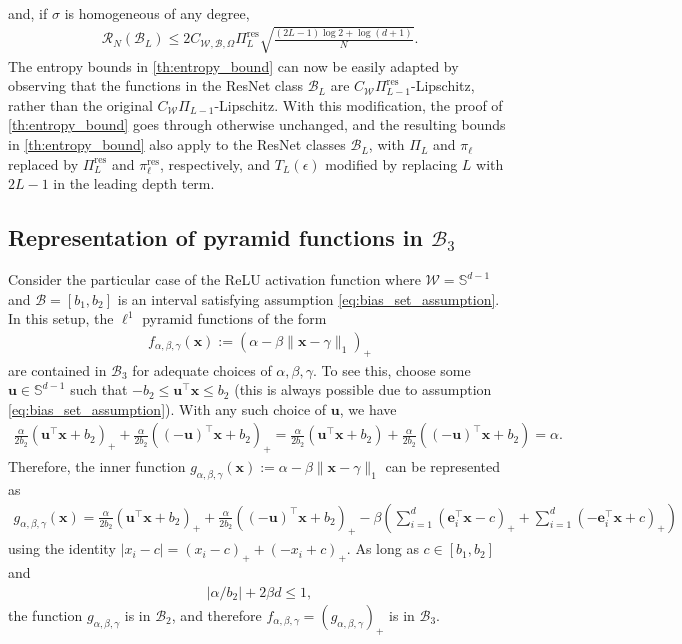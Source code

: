 \documentclass{article}
\def\ve{{\bm{e}}}
\def\vu{{\bm{u}}}
\def\vx{{\bm{x}}}
\def\cB{{\mathcal{B}}}
\def\cR{{\mathcal{R}}}
\def\cW{{\mathcal{W}}}
\def\bS{{\mathbb{S}}}
\begin{document}
\begin{appendices}
\begin{align}
    \end{align}
    and, if $\sigma$ is homogeneous of any degree,
    \begin{align}
        \cR_N(\cB_L) \leq 2 C_{\cW, \cB, \Omega} \Pi_L^{\mathrm{res}} \sqrt{\frac{(2L-1) \log 2 + \log(d+1)}{N}}.
    \end{align}
    The entropy bounds in \cref{th:entropy_bound} can now be easily adapted by observing that the functions in the ResNet class $\cB_L$ are $C_{\cW} \Pi_{L-1}^{\mathrm{res}}$-Lipschitz, rather than the original $C_{\cW} \Pi_{L-1}$-Lipschitz. With this modification, the proof of \cref{th:entropy_bound} goes through otherwise unchanged, and the resulting bounds in \cref{th:entropy_bound} also apply to the ResNet classes $\cB_L$, with $\Pi_L$ and $\pi_\ell$ replaced by $\Pi_L^{\mathrm{res}}$ and $\pi_\ell^{\mathrm{res}}$, respectively, and $T_L(\epsilon)$ modified by replacing $L$ with $2L-1$ in the leading depth term.
    


\subsection{Representation of pyramid functions in $\cB_3$} \label{appendix:pyramid_relu_rep}

Consider the particular case of the ReLU activation function where $\cW = \bS^{d-1}$ and $\cB = [b_1, b_2]$ is an interval satisfying assumption \eqref{eq:bias_set_assumption}. In this setup, the $\ell^1$ pyramid functions of the form
\begin{align}
    f_{\alpha, \beta, \gamma} (\vx) := (\alpha - \beta \| \vx - \gamma \|_1)_+
\end{align}
are contained in $\cB_3$ for adequate choices of $\alpha, \beta, \gamma$. To see this, choose some $\vu \in \bS^{d-1}$ such that $-b_2 \leq \vu^\top \vx \leq b_2$ (this is always possible due to assumption \eqref{eq:bias_set_assumption}). With any such choice of $\vu$, we have
\begin{align}
	\frac{\alpha}{2b_2} (\vu^\top \vx + b_2)_+ + \frac{\alpha}{2 b_2} ((-\vu)^\top \vx + b_2)_+ = \frac{\alpha}{2b_2} (\vu^\top \vx + b_2) + \frac{\alpha}{2 b_2} ((-\vu)^\top \vx + b_2) = \alpha.
\end{align}
Therefore, the inner function $g_{\alpha, \beta, \gamma} (\vx) := \alpha - \beta \| \vx - \gamma \|_1$ can be represented as
\begin{align} \label{eq:inner_pyramid_relu_rep}
    g_{\alpha, \beta, \gamma} (\vx) = \frac{\alpha}{2b_2} (\vu^\top \vx + b_2)_+ + \frac{\alpha}{2 b_2} ((-\vu)^\top \vx + b_2)_+ - \beta \left(\sum_{i=1}^d (\ve_i^\top \vx - c)_+ + \sum_{i=1}^d (-\ve_i^\top \vx + c)_+ \right)
\end{align}
using the identity $|x_i - c| = (x_i - c)_+ + (-x_i + c)_+$. As long as $c \in [b_1, b_2]$ and
\begin{align}
|\alpha/b_2| + 2 \beta d \leq 1,
\end{align}
the function $g_{\alpha, \beta, \gamma}$ is in $\cB_2$, and therefore $f_{\alpha, \beta, \gamma} = (g_{\alpha, \beta, \gamma})_+$ is in $\cB_3$. 


\end{appendices}
\end{document}
